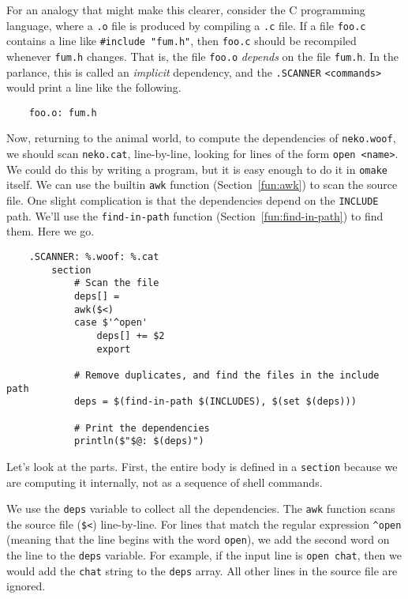 For an analogy that might make this clearer, consider the C programming language, where a \verb+.o+
file is produced by compiling a \verb+.c+ file.  If a file \verb+foo.c+ contains a line like
\verb+#include "fum.h"+, then \verb+foo.c+ should be recompiled whenever \verb+fum.h+ changes.  That
is, the file \verb+foo.o+ \emph{depends} on the file \verb+fum.h+.  In the \OMake{} parlance, this is
called an \emph{implicit} dependency, and the \verb+.SCANNER+ \verb+<commands>+ would print a line
like the following.

\begin{verbatim}
    foo.o: fum.h
\end{verbatim}

 Now, returning to the animal world, to compute the dependencies of \verb+neko.woof+, we
should scan \verb+neko.cat+, line-by-line, looking for lines of the form \verb+open <name>+.  We
could do this by writing a program, but it is easy enough to do it in \verb+omake+ itself.  We can
use the builtin \verb+awk+ function (Section~\ref{fun:awk}) to scan the source file.  One slight complication
is that the dependencies depend on the \verb+INCLUDE+ path.  We'll use the
\verb+find-in-path+ function (Section~\ref{fun:find-in-path}) to find them.  Here we go.

\begin{verbatim}
    .SCANNER: %.woof: %.cat
        section
            # Scan the file
            deps[] =
            awk($<)
            case $'^open'
                deps[] += $2
                export

            # Remove duplicates, and find the files in the include path
            deps = $(find-in-path $(INCLUDES), $(set $(deps)))

            # Print the dependencies
            println($"$@: $(deps)")
\end{verbatim}

Let's look at the parts.  First, the entire body is defined in a \verb+section+ because we are
computing it internally, not as a sequence of shell commands.

We use the \verb+deps+ variable to collect all the dependencies.  The \verb+awk+ function scans the
source file (\verb+$<+) line-by-line.  For lines that match the regular expression \verb+^open+
(meaning that the line begins with the word \verb+open+), we add the second word on the line to the
\verb+deps+ variable.  For example, if the input line is \verb+open chat+, then we would add the
\verb+chat+ string to the \verb+deps+ array.  All other lines in the source file are ignored.

